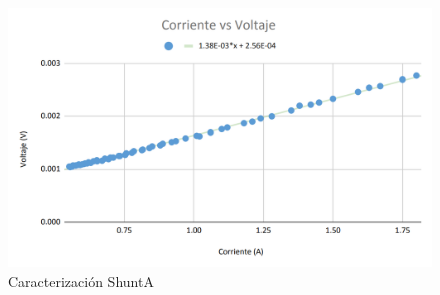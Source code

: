 \begin{figure}[H]
    \begin{center}
    \includegraphics[width = 15cm]{3Proyecto/CorrienteVoltaje1.png}
    \caption{ Caracterización ShuntA} 
    \label{fig:Muestras ShuntA}
    \end{center}
\end{figure}




